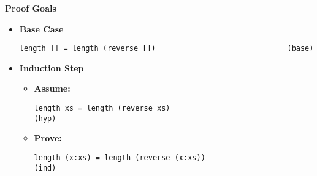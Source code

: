 \documentclass[11pt]{article}
\theoremstyle{definition}
\begin{document}
\begin{enumerate}
\begin{enumerate}[(a)]
\textbf{Proof Goals}
\begin{itemize}
  \item \textbf{Base Case}
  	\begin{verbatim}
length [] = length (reverse [])                              (base)
	\end{verbatim}
	\item \textbf{Induction Step}
		\begin{itemize}
		\item \textbf{Assume:}
		\begin{verbatim}
length xs = length (reverse xs)                          	 (hyp)
		\end{verbatim}
		\item \textbf{Prove:}
		\begin{verbatim}
length (x:xs) = length (reverse (x:xs))                    (ind)
		\end{verbatim}
		\end{itemize}
\end{itemize}


\end{enumerate}
\end{enumerate}
\end{document}
